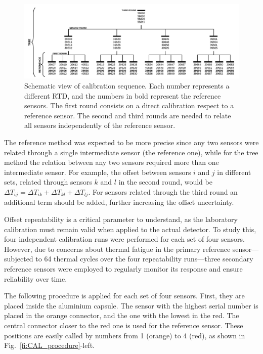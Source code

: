 \begin{figure}[htbp]
\centering
\includegraphics[width=\textwidth]{images/figure_7.pdf}
\caption{Schematic view of calibration sequence. Each number represents a different RTD, and the numbers in bold represent the reference sensors. The first round consists on a direct calibration respect to a reference sensor. The second and third rounds are needed to relate all sensors independently of the reference sensor.
\label{fi:CAL_sequence}}
\end{figure}

The reference method was expected to be more precise since any two sensors were related through a single intermediate sensor (the reference one), while for the tree method the relation between any two sensors required more than one intermediate sensor. For example, the offset between sensors $i$ and $j$ in different sets, related through sensors $k$ and $l$ in the second round, would be $\Delta T_{ij} = \Delta T_{ik} + \Delta T_{kl} + \Delta T_{lj}$. For sensors related through the third round an additional term should be added, further increasing the offset uncertainty. 

Offset repeatability is a critical parameter to understand, as the laboratory calibration must remain valid when applied to the actual detector. To study this, four independent calibration runs were performed for each set of four sensors. However, due to concerns about thermal fatigue in the primary reference sensor---subjected to 64 thermal cycles over the four repeatability runs---three secondary reference sensors were employed to regularly monitor its response and ensure reliability over time.

The following procedure is applied for each set of four sensors. First, they are placed inside the aluminium capsule. The sensor with the highest serial number is placed in the orange connector, and the one with the lowest in the red. The central connector closer to the red one is used for the reference sensor. These positions are easily called by numbers from 1 (orange) to 4 (red), as shown in Fig.~\ref{fi:CAL_procedure}-left.

